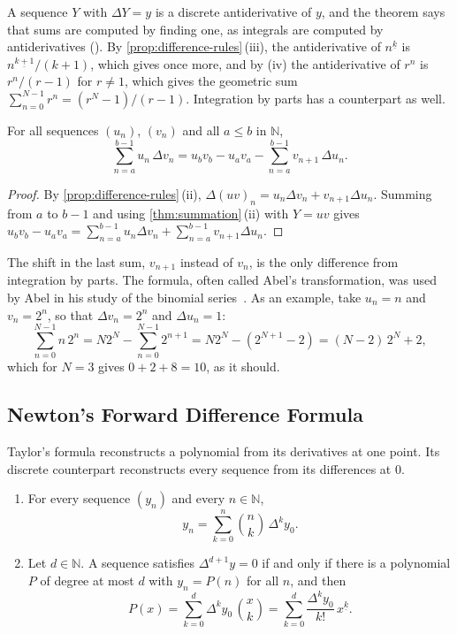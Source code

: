 A sequence $Y$ with $\Delta Y=y$ is a discrete antiderivative of $y$, and the theorem says that sums are computed by finding one, as integrals are computed by antiderivatives (). By \cref{prop:difference-rules}\,(iii), the antiderivative of $n^{\underline k}$ is $n^{\underline{k+1}}/(k+1)$, which gives  once more, and by (iv) the antiderivative of $r^n$ is $r^n/(r-1)$ for $r\ne1$, which gives the geometric sum $\sum_{n=0}^{N-1}r^n=(r^N-1)/(r-1)$. Integration by parts has a counterpart as well.

\begin{proposition}
\label{prop:summation-by-parts}
For all sequences $(u_n)$, $(v_n)$ and all $a\le b$ in $\mathbb N$,
\[
\sum_{n=a}^{b-1}u_n\,\Delta v_n=u_bv_b-u_av_a-\sum_{n=a}^{b-1}v_{n+1}\,\Delta u_n .
\]
\end{proposition}

\begin{proof}
By \cref{prop:difference-rules}\,(ii), $\Delta(uv)_n=u_n\Delta v_n+v_{n+1}\Delta u_n$. Summing from $a$ to $b-1$ and using \cref{thm:summation}\,(ii) with $Y=uv$ gives $u_bv_b-u_av_a=\sum_{n=a}^{b-1}u_n\Delta v_n+\sum_{n=a}^{b-1}v_{n+1}\Delta u_n$.
\end{proof}

The shift in the last sum, $v_{n+1}$ instead of $v_n$, is the only difference from integration by parts. The formula, often called Abel's transformation, was used by Abel in his study of the binomial series~\cite{abel1826}. As an example, take $u_n=n$ and $v_n=2^n$, so that $\Delta v_n=2^n$ and $\Delta u_n=1$:
\[
\sum_{n=0}^{N-1}n\,2^n=N2^N-\sum_{n=0}^{N-1}2^{n+1}=N2^N-(2^{N+1}-2)=(N-2)\,2^N+2,
\]
which for $N=3$ gives $0+2+8=10$, as it should.

\subsection{Newton's Forward Difference Formula}

Taylor's formula reconstructs a polynomial from its derivatives at one point. Its discrete counterpart reconstructs every sequence from its differences at $0$.

\begin{theorem}
\label{thm:newton-forward}
\leavevmode
\begin{enumerate}
\item For every sequence $(y_n)$ and every $n\in\mathbb N$,
\[
y_n=\sum_{k=0}^n\binom nk\,\Delta^ky_0 .
\]
\item Let $d\in\mathbb N$. A sequence satisfies $\Delta^{d+1}y=0$ if and only if there is a polynomial $P$ of degree at most $d$ with $y_n=P(n)$ for all $n$, and then
\[
P(x)=\sum_{k=0}^d\Delta^ky_0\,\binom xk=\sum_{k=0}^d\frac{\Delta^ky_0}{k!}\,x^{\underline k} .
\]
\end{enumerate}
\end{theorem}

